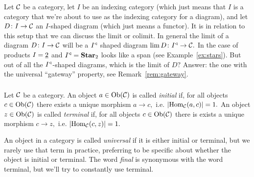 \documentclass[CT4S-EN-RU]{subfiles}
\begin{document}
\begin{blockENG}
Let $\mathcal{C}$ be a category, let $I$ be an indexing category (which just means that $I$ is a category that we're about to use as the indexing category for a diagram), and let $D\colon I\rightarrow\mathcal{C}$ an $I$-shaped diagram (which just means a functor). It is in relation to this setup that we can discuss the limit or colimit. In general the limit of a diagram $D\colon I\rightarrow\mathcal{C}$ will be a $I^\triangleleft$ shaped diagram $\lim D\colon I^\triangleleft\rightarrow\mathcal{C}.$ In the case of products $I=\underline{2}$ and $I^\triangleleft={\mathbf{Star}}_2$ looks like a span (see Example~\ref{ex:stars}). But out of all the $I^\triangleleft$-shaped diagrams, which is the limit of $D?$ Answer: the one with the universal “gateway” property, see Remark~\ref{rem:gateway}.
\end{blockENG}

\begin{blockRUS}
\end{blockRUS}


\subsubsection{}

\begin{definitionENG}
Let $\mathcal{C}$ be a category. An object $a\in\textnormal{Ob}(\mathcal{C})$ is called {\em initial} if, for all objects $c\in\textnormal{Ob}(\mathcal{C})$ there exists a unique morphism $a\to c,$ i.e. $|\textnormal{Hom}_\mathcal{C}(a,c)|=1.$ An object $z\in\textnormal{Ob}(\mathcal{C})$ is called {\em terminal} if, for all objects $c\in\textnormal{Ob}(\mathcal{C})$ there is exists a unique morphism $c\to z,$ i.e. $|\textnormal{Hom}_\mathcal{C}(c,z)|=1.$ 
\end{definitionENG}

\begin{definitionRUS}
\end{definitionRUS}

\begin{blockENG}
An object in a category is called {\em universal} if it is either initial or terminal, but we rarely use that term in practice, preferring to be specific about whether the object is initial or terminal. The word {\em final} is synonymous with the word terminal, but we'll try to constantly use terminal. 
\end{blockENG}

\begin{blockRUS}
\end{blockRUS}
\end{document}
